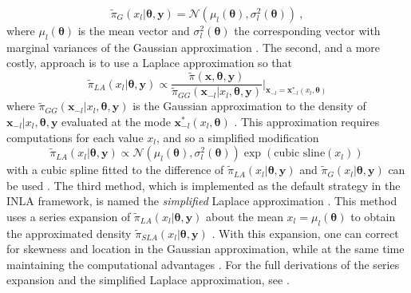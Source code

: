\begin{equation}
    \tilde{\pi}_G(x_l\lvert\boldsymbol{\theta}, \mathbf{y}) = \mathcal{N}(\mu_l(\boldsymbol{\theta}), \sigma_l^2(\boldsymbol{\theta})) \ ,
\end{equation} 
where $\mu_l(\boldsymbol{\theta})$ is the mean vector and $\sigma_l^2(\boldsymbol{\theta})$ the corresponding vector with marginal variances of the Gaussian approximation \citep{rue2009inla}. The second, and a more costly, approach is to use a Laplace approximation so that 
\begin{equation}
    \tilde{\pi}_{LA}(x_l\lvert\boldsymbol{\theta}, \mathbf{y}) \propto \frac{\tilde{\pi}(\mathbf{x}, \boldsymbol{\theta}, \mathbf{y})}{\tilde{\pi}_{GG}(\mathbf{x}_{-l}\lvert x_l, \boldsymbol{\theta}, \mathbf{y})} \bigg\lvert_{\mathbf{x}_{-l}=\mathbf{x}_{-l}^*(x_l, \boldsymbol{\theta})}
\end{equation} 
where $\tilde{\pi}_{GG}(\mathbf{x}_{-l}\lvert x_l, \boldsymbol{\theta}, \mathbf{y})$ is the Gaussian approximation to the density of $\mathbf{x}_{-l}\lvert x_l, \boldsymbol{\theta}, \mathbf{y}$ evaluated at the mode $\mathbf{x}_{-l}^*(x_l, \boldsymbol{\theta})$ \citep{gomezrubio2020inla}. This approximation requires computations for each value $x_l$, and so a simplified modification 
\begin{equation}
    \tilde{\pi}_{LA}(x_l\lvert\boldsymbol{\theta}, \mathbf{y}) \propto \mathcal{N}(\mu_l(\boldsymbol{\theta}), \sigma_l^2(\boldsymbol{\theta}))\exp(\text{cubic sline}(x_l)) \, 
\end{equation}
with a cubic spline fitted to the difference of $\tilde{\pi}_{LA}(x_l\lvert\boldsymbol{\theta}, \mathbf{y})$ and $\tilde{\pi}_G(x_l\lvert\boldsymbol{\theta}, \mathbf{y})$ can be used \citep{rue2009inla}. The third method, which is implemented as the default strategy in the INLA framework, is named the \textit{simplified} Laplace approximation \citep{rue2009inla}. This method uses a series expansion of $\tilde{\pi}_{LA}(x_l\lvert\boldsymbol{\theta}, \mathbf{y})$ about the mean $x_l = \mu_l(\boldsymbol{\theta})$ to obtain the approximated density $\tilde{\pi}_{SLA}(x_l\lvert\boldsymbol{\theta}, \mathbf{y})$ \citep{gomezrubio2020inla}. With this expansion, one can correct for skewness and location in the Gaussian approximation, while at the same time maintaining the computational advantages \citep{gomezrubio2020inla}. For the full derivations of the series expansion and the simplified Laplace approximation, see \citet[chapter 3.2.3]{rue2009inla}.
